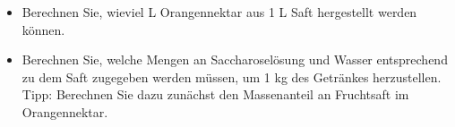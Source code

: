 \documentclass[a4paper,11pt]{article}
\newif\ifshowme
\begin{document}
\begin{itemize}


\item Berechnen Sie, wieviel L Orangennektar aus 1 L Saft hergestellt werden können.
\ifshowme
\antwort{
\begin{align*}
\frac{9g}{L} \cdot 1 L &= \frac{5g}{L} \cdot x  \\
x &= \frac{9g}{L} \cdot \frac{L}{5g} \\
x &= \frac{9}{5} = 1,8 L
\end{align*}

}
\else
\fi





\pp
\item Berechnen Sie, welche Mengen an Saccharoselösung und Wasser entsprechend zu dem
Saft zugegeben werden müssen, um 1 kg des Getränkes herzustellen. Tipp: Berechnen Sie
dazu zunächst den Massenanteil an Fruchtsaft im Orangennektar.
\ifshowme
\antwort{
\begin{align*}
m_1 &= 1,8 ~\text{L} \cdot 1,0299 ~\text{kg/L} = 1,854 ~\text{kg} \\
m_2 &= 1 ~\text{L} \cdot 1,0465 ~\text{kg/L} = 1,0465 ~\text{kg} \\ 
\rightarrow \frac{1,0465 ~\text{kg}}{1,854 ~\text{kg}} &=  0,5644 ~\text{kg}
\end{align*}
Um einen Liter Nektar herstellen zu können benötigen wir 0,5644 kg Saft. \par 
Menge Zucker aus Saft berechnen:
\begin{align*}
0,5644 ~\text{kg} \cdot 0,12 = 0,068 ~\text{kg}
\end{align*}
Da wir 1 kg $\cdot $ 8° Brix = 0,08 kg Zucker in unserem Nektar benötigen, fehlen noch:
\begin{align*}
0,08~\text{kg} - 0,068~\text{kg} = 0,012 ~\text{kg}
\end{align*}
Dafür benötigen wir folgende Menge 65\% Saccharose-Lösung:
\begin{align*}
\frac{0,012~\text{kg}}{0,65} = 0,0185 ~\text{kg}
\end{align*}
Und der Rest ist Wasser:
\begin{align*}
(1-0,5644-0,0185)~\text{kg} = 0,4171 ~\text{kg}
\end{align*}
}
\else
\fi



\end{itemize}
\end{document}
